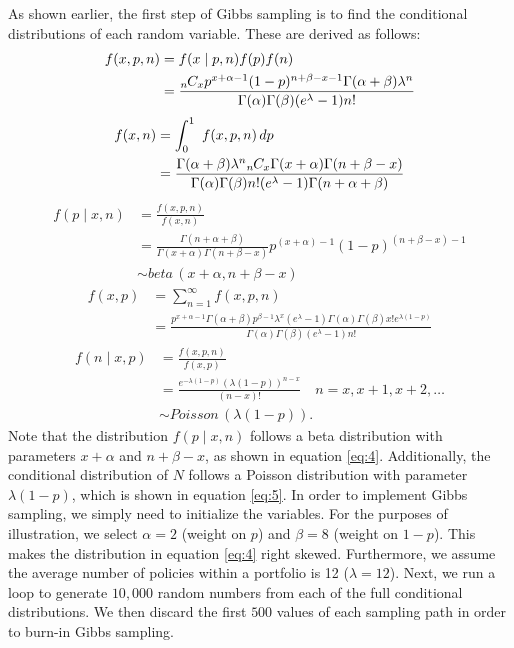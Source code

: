 \documentclass[11pt, oneside]{article}
\begin{document}
As shown earlier, the first step of Gibbs sampling is to find the conditional distributions of each random variable. These are derived as follows:
\begin{align*}
f(x,p,n) &= f(x\mid p,n)f(p)f(n)\\
&= \frac{{{}_{n}\mkern-1muC_{x}}p^{x+\alpha-1}(1-p)^{n+\beta-x-1}\Gamma(\alpha+\beta)\lambda^n}{\Gamma(\alpha)\Gamma(\beta)(e^\lambda-1)n!}
\end{align*}
\begin{align*}
f(x,n) &= \int_0^1\ f(x,p,n)\,dp\\
&= \frac{\Gamma(\alpha+\beta)\lambda^n{{}_{n}\mkern-1muC_{x}}\Gamma(x+\alpha)\Gamma(n+\beta-x)}{\Gamma(\alpha)\Gamma(\beta)n!(e^\lambda-1)\Gamma(n+\alpha+\beta)}
\end{align*}
\begin{align}
f(p\mid x,n) &= \frac{f(x,p,n)}{f(x,n)}\nonumber\\
&= \frac{\Gamma(n+\alpha+\beta)}{\Gamma(x+\alpha)\Gamma(n+\beta-x)}p^{(x+\alpha)-1}(1-p)^{(n+\beta-x)-1}\label{eq:4}\\
&\sim beta\,(x+\alpha, n+\beta-x)\nonumber
\end{align}
\begin{align*}
f(x,p) &= \sum_{n=1}^\infty f(x,p,n)\\
&= \frac{p^{x+\alpha-1}\Gamma(\alpha+\beta)p^{\beta-1}\lambda^x(e^\lambda-1)\Gamma(\alpha)\Gamma(\beta)x!e^{\lambda(1-p)}}{\Gamma(\alpha)\Gamma(\beta)(e^\lambda-1)n!}
\end{align*}
\begin{align}
f(n\mid x,p) &= \frac{f(x,p,n)}{f(x,p)}\nonumber\\
&= \frac{e^{-\lambda(1-p)}(\lambda(1-p))^{n-x}}{(n-x)!}\quad\mbox{$n =x,x+1,x+2,\ldots$}\label{eq:5}\\
&\sim Poisson\,(\lambda(1-p)).\nonumber
\end{align}
Note that the distribution $f(p\mid x,n)$ follows a beta distribution with parameters $x+\alpha$ and $n+\beta-x$, as shown in equation \ref{eq:4}. Additionally, the conditional distribution of $N$ follows a Poisson distribution with parameter $\lambda(1-p)$, which is shown in equation \ref{eq:5}. In order to implement Gibbs sampling, we simply need to initialize the variables. For the purposes of illustration, we select $\alpha=2$ (weight on $p$) and $\beta=8$ (weight on $1-p$). This makes the distribution in equation \ref{eq:4} right skewed. Furthermore, we assume the average number of policies within a portfolio is 12 ($\lambda=12$). Next, we run a loop to generate $10,000$ random numbers from each of the full conditional distributions. We then discard the first $500$ values of each sampling path in order to burn-in Gibbs sampling. 
\end{document}
